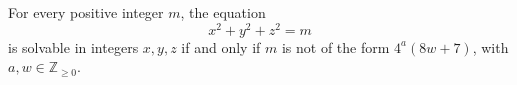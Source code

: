 \begin{proposition}
    For every positive integer \(m\), the equation
\[
    x^2+y^2+z^2=m
\]
    is solvable in integers \(x,y,z\) if and only if \(m\) is not of the form
    \(4^a(8w+7)\), with \(a,w\in\mathbb{Z}_{\ge 0}\).
\end{proposition}
